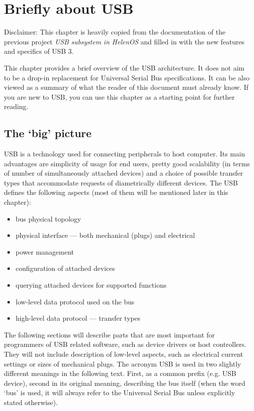 \section{Briefly about USB}
\label{sec:usb_briefly}

Disclaimer: This chapter is heavily copied from the documentation of the
previous project \textit{USB subsystem in HelenOS} and filled in with the new
features and specifics of USB 3.

This chapter provides a brief overview of the USB architecture. It does not aim
to be a drop-in replacement for Universal Serial Bus specifications. It can be
also viewed as a summary of what the reader of this document must already know.
If you are new to USB, you can use this chapter as a starting point for further
reading.

\subsection{The ‘big’ picture}

USB is a technology used for connecting peripherals to host computer. Its main
advantages are simplicity of usage for end users, pretty good scalability (in
terms of number of simultaneously attached devices) and a choice of possible
transfer types that accommodate requests of diametrically different devices.
The USB defines the following aspects (most of them will be mentioned later in
this chapter):

\begin{itemize}
\item bus physical topology
\item physical interface — both mechanical (plugs) and electrical
\item power management
\item configuration of attached devices
\item querying attached devices for supported functions
\item low-level data protocol used on the bus
\item high-level data protocol — transfer types
\end{itemize}

The following sections will describe parts that are most important for
programmers of USB related software, such as device drivers or host
controllers. They will not include description of low-level aspects, such as
electrical current settings or sizes of mechanical plugs. The acronym USB is
used in two slightly different meanings in the following text. First, as a
common prefix (e.g. USB device), second in its original meaning, describing the
bus itself (when the word ‘bus’ is used, it will always refer to the Universal
Serial Bus unless explicitly stated otherwise).

